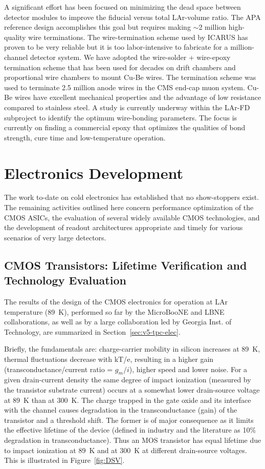 A significant effort has been focused on minimizing the dead space between detector modules to improve
the fiducial versus total LAr-volume ratio. The APA reference design accomplishes this goal but requires making $\sim$2 million high-quality wire terminations. The wire-termination scheme used by ICARUS has proven to be very reliable but it is too labor-intensive to fabricate for a million-channel detector system. We have adopted the wire-solder + wire-epoxy termination scheme that has been used for decades on drift chambers and proportional wire chambers to mount Cu-Be wires. The termination scheme was used to terminate 2.5 million  anode wires in the CMS end-cap muon system. Cu-Be wires have excellent mechanical properties and the advantage of low resistance compared to stainless steel. A study is currently underway within the LAr-FD subproject to identify the optimum wire-bonding parameters. The focus is currently on finding a commercial epoxy that optimizes the qualities of bond strength, cure time and low-temperature operation.

 \section{Electronics Development}
 
 The work to-date on cold electronics has established that no show-stoppers exist. The remaining activities outlined here concern performance optimization of the CMOS ASICs, the evaluation of several widely available CMOS technologies, and the development of readout architectures appropriate and timely for various scenarios of very large detectors.

\subsection{CMOS Transistors: Lifetime Verification and Technology Evaluation}

The results of the design of the CMOS electronics for operation at LAr temperature (89~K), performed so far by the MicroBooNE and LBNE collaborations, as well as by a large collaboration led by Georgia Inst. of Technology, are summarized in Section~\ref{sec:v5-tpc-elec}.

Briefly, the fundamentals are: charge-carrier mobility in silicon increases at 89~K, thermal fluctuations decrease with kT/e, resulting in a higher gain (transconductance/current ratio =
 $g_{m}/ i$), higher speed and lower noise. For a given drain-current density the same degree of impact ionization (measured by the transistor substrate current) occurs at a somewhat lower drain-source voltage at 89~K than at 300~K. The charge trapped in the gate oxide and its interface with the channel causes degradation in the transconductance (gain) of the transistor and a threshold shift. The former is of major consequence as it limits the effective lifetime of the device (defined in industry and the literature as 10\% degradation in transconductance). Thus an MOS transistor has equal lifetime due to impact ionization at 89~K and at 300~K at different drain-source voltages. This is illustrated in Figure~\ref{fig:DSV}.  

